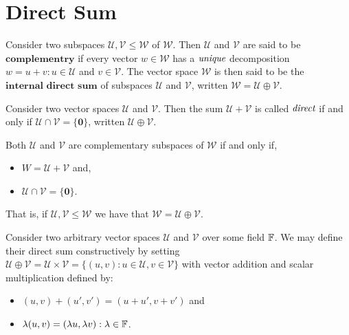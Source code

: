
\section{Direct Sum} %
\label{sec:directsum}

Consider two subspaces $\mathcal{U},\mathcal{V} \leq \mathcal{W}$
of $\mathcal{W}$. Then $\mathcal{U}$ and $\mathcal{V}$ are said to be
$\textbf{complementry}$ if every vector $w \in \mathcal{W}$ has a
$\emph{unique}$ decomposition $w=u+v : u \in \mathcal{U}$
and $v \in \mathcal{V}$. The vector space $\mathcal{W}$ is then said to
be the $\textbf{internal direct sum}$ of subspaces $\mathcal{U}$
and $\mathcal{V}$, written $\mathcal{W} = \mathcal{U} \oplus \mathcal{V}$.

\begin{defn}
	Consider two vector spaces $\mathcal{U}$ and $\mathcal{V}$.
	Then the sum $\mathcal{U} + \mathcal{V}$ is called $\emph{direct}$
	if and only if $\mathcal{U} \cap \mathcal{V} = \{ \mathbf{0} \}$,
	written $\mathcal{U} \oplus \mathcal{V}$.
\end{defn}

\begin{defn}
	Both $\mathcal{U}$ and $\mathcal{V}$ are complementary subspaces
	of $\mathcal{W}$ if and only if,
	\begin{itemize}
		\item $W = \mathcal{U} + \mathcal{V}$ and,
		\item $\mathcal{U} \cap \mathcal{V} = \{ \mathbf{0} \}$.
	\end{itemize}
	That is, if $\mathcal{U},\mathcal{V} \leq \mathcal{W}$ we have that
	$\mathcal{W} = \mathcal{U} \oplus \mathcal{V}$.
\end{defn}

\begin{defn}
	Consider two arbitrary vector spaces $\mathcal{U}$ and $\mathcal{V}$
	over some field $\mathbb{F}$. We may define their direct sum constructively
	by setting $\mathcal{U} \oplus \mathcal{V}
	= \mathcal{U} \times \mathcal{V}
	= \{ (u,v) : u \in \mathcal{U}, v \in \mathcal{V} \}$ with vector
	addition and scalar multiplication defined by:
	\begin{itemize}
		\item $(u,v)+(u',v')=(u+u',v+v')$ and
		\item $\lambda (u,v) = ( \lambda u, \lambda v) : \lambda \in \mathbb{F}$.
	\end{itemize}
\end{defn}

